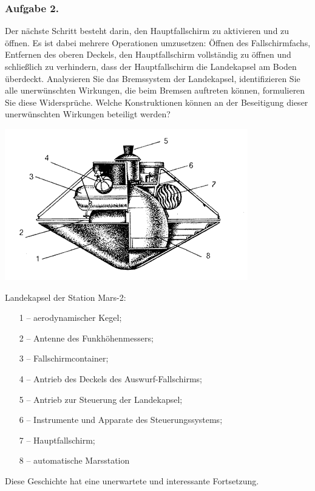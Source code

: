 \documentclass[11pt,a4paper]{article}
\begin{document}
\subsubsection*{Aufgabe 2.}
Der nächste Schritt besteht darin, den Hauptfallschirm zu aktivieren und zu
öffnen. Es ist dabei mehrere Operationen umzusetzen: Öffnen des
Fallschirmfachs, Entfernen des oberen Deckels, den Hauptfallschirm vollständig
zu öffnen und schließlich zu verhindern, dass der Hauptfallschirm die
Landekapsel am Boden überdeckt. Analysieren Sie das Bremssystem der
Landekapsel, identifizieren Sie alle unerwünschten Wirkungen, die beim Bremsen
auftreten können, formulieren Sie diese Widersprüche. Welche Konstruktionen
können an der Beseitigung dieser unerwünschten Wirkungen beteiligt werden?
\begin{center}
\includegraphics[width=.4\textwidth]{GIj0Ml.png}\hfill
  \begin{minipage}[b]{.55\textwidth}\small
    Landekapsel der Station Mars-2:
    \begin{itemize}[noitemsep]
    \item[1] -- aerodynamischer Kegel;
    \item[2] -- Antenne des Funkhöhenmessers;
    \item[3] -- Fallschirmcontainer;
    \item[4] -- Antrieb des Deckels des Auswurf-Fallschirms;
    \item[5] -- Antrieb zur Steuerung der Landekapsel;
    \item[6] -- Instrumente und Apparate des Steuerungssystems;
    \item[7] -- Hauptfallschirm;
    \item[8] -- automatische Marsstation
    \end{itemize}
  \end{minipage}
\end{center}
Diese Geschichte hat eine unerwartete und interessante Fortsetzung.
\end{document}
